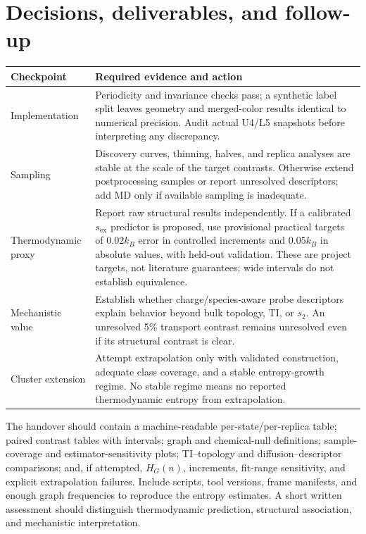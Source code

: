 \documentclass[11pt,a4paper]{article}
\newcommand{\sex}{s_{\mathrm{ex}}}
\begin{document}
\section{Decisions, deliverables, and follow-up}
\begin{longtable}{@{}p{}p{}@{}}
\toprule
Checkpoint & Required evidence and action\\
\midrule
\endhead
Implementation & Periodicity and invariance checks pass; a synthetic label split
leaves geometry and merged-color results identical to numerical precision.
Audit actual U4/L5 snapshots before interpreting any discrepancy.\\[3pt]
Sampling & Discovery curves, thinning, halves, and replica analyses are stable
at the scale of the target contrasts. Otherwise extend postprocessing samples
or report unresolved descriptors; add MD only if available sampling is inadequate.\\[3pt]
Thermodynamic proxy & Report raw structural results independently. If a
calibrated $\sex$ predictor is proposed, use provisional practical targets
of $0.02k_B$ error in controlled increments and $0.05k_B$ in absolute values,
with held-out validation. These are project targets, not literature guarantees;
wide intervals do not establish equivalence.\\[3pt]
Mechanistic value & Establish whether charge/species-aware probe descriptors
explain behavior beyond bulk topology, TI, or $s_2$. An unresolved 5\% transport
contrast remains unresolved even if its structural contrast is clear.\\[3pt]
Cluster extension & Attempt extrapolation only with validated construction,
adequate class coverage, and a stable entropy-growth regime. No stable regime
means no reported thermodynamic entropy from extrapolation.\\
\bottomrule
\end{longtable}

The handover should contain a machine-readable per-state/per-replica table;
paired contrast tables with intervals; graph and chemical-null definitions;
sample-coverage and estimator-sensitivity plots; TI--topology and
diffusion--descriptor comparisons; and, if attempted, $H_G(n)$, increments,
fit-range sensitivity, and explicit extrapolation failures. Include scripts,
tool versions, frame manifests, and enough graph frequencies to reproduce
the entropy estimates. A short written assessment should distinguish
thermodynamic prediction, structural association, and mechanistic interpretation.
\end{document}

